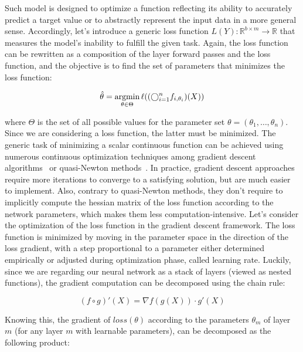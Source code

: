         Such model is designed to optimize a function reflecting its ability to accurately predict a target value or to abstractly represent the input 
        data in a more general sense. Accordingly, let's introduce a generic loss function $L(Y): \mathbb{R}^{b \times m} \rightarrow \mathbb{R}$ that measures 
        the model's inability to fulfill the given task. Again, the loss function can be rewritten as a composition of the layer forward passes and the loss
        function, and the objective is to find the set of parameters that minimizes the loss function:

        \begin{equation}
            \hat{\theta} = \operatorname*{argmin}_{\theta \in \Theta} \ell((\bigcirc_{i=1}^{n} f_{i, \theta_i})(X))
        \end{equation}

        where $\Theta$ is the set of all possible values for the parameter set $\theta = (\theta_1, \ldots, \theta_n)$.
        Since we are considering a loss function, the latter must be minimized.
        The generic task of minimizing a scalar continuous function can be achieved
        using numerous continuous optimization techniques  among gradient descent algorithms~\cite{DBLP:journals/corr/Ruder16}
        or quasi-Newton methods~\cite{LBFGS}. In practice, gradient descent approaches require more iterations to converge to a satisfying solution,
        but are much easier to implement. Also, contrary to quasi-Newton methods, they don't require to implicitly compute the hessian matrix of the loss
        function according to the network parameters, which makes them less computation-intensive. Let's consider the optimization of the loss function
        in the gradient descent framework. The loss function is minimized by moving in the parameter space in the direction of the loss gradient, with
        a step proportional to a parameter either determined empirically or adjusted during optimization phase, called learning rate.
        Luckily, since we are regarding our neural network as a stack of layers (viewed as nested functions), the gradient computation can be decomposed
        using the chain rule:

        \begin{equation} \label{eq:backprop}
            (f \circ g)'(X) = \nabla f(g(X)) \cdot g'(X)
        \end{equation}

        Knowing this, the gradient of $loss(\theta)$ according to the parameters $\theta_m$ of layer $m$ (for any layer $m$ with learnable parameters),
        can be decomposed as the following product:

